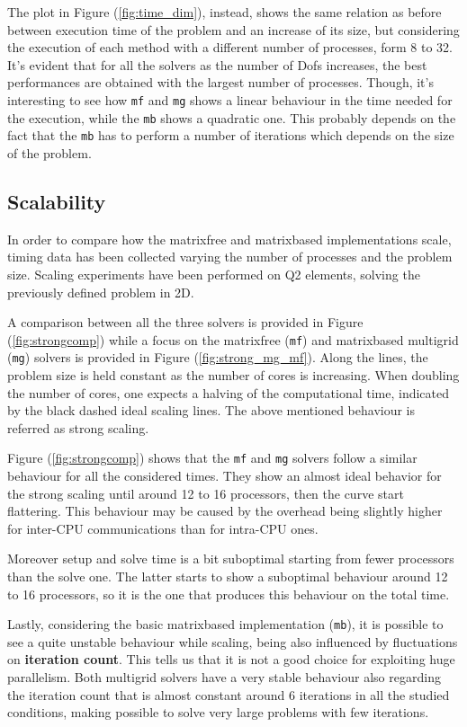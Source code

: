 \documentclass{article}
\begin{document}


The plot in Figure (\ref{fig:time_dim}), instead, shows the same relation as before between execution time of the problem and an increase of its size, but considering the execution of each method with a different number of processes, form 8 to 32.
It's evident that for all the solvers as the number of Dofs increases, the best performances are obtained with the largest number of processes.
Though, it's interesting to see how \verb|mf| and \verb|mg| shows a linear behaviour in the time needed for the execution, while the \verb|mb| shows a quadratic one.  This probably depends on the fact that the \verb|mb| has to perform a number of iterations which depends on the size of the problem.



\subsection{Scalability}
In order to compare how the matrixfree and matrixbased implementations scale, timing data has been collected varying the number of processes and the problem size. Scaling experiments have been performed on Q2 elements, solving the previously defined problem in 2D.

A comparison between all the three solvers is provided in Figure (\ref{fig:strongcomp}) while a focus on the matrixfree (\verb|mf|) and matrixbased multigrid (\verb|mg|) solvers is provided in Figure (\ref{fig:strong_mg_mf}).
Along the lines, the problem size is held constant as the number of cores is increasing. When doubling the number of cores, one expects a halving of the computational time, indicated by the black dashed ideal scaling lines. The above mentioned behaviour is referred as strong scaling.

Figure (\ref{fig:strongcomp}) shows that the \verb|mf| and \verb|mg| solvers follow a similar behaviour for all the considered times. They show an almost ideal behavior for the strong scaling until around 12 to 16 processors, then the curve start flattering. This behaviour may be caused by the overhead being slightly higher for inter-CPU communications than for intra-CPU ones.

Moreover setup and solve time is a bit suboptimal starting from fewer processors than the solve one. The latter starts to show a suboptimal behaviour around 12 to 16 processors, so it is the one that produces this behaviour on the total time.

Lastly, considering the basic matrixbased implementation (\verb|mb|), it is possible to see a quite unstable behaviour while scaling, being also influenced by fluctuations on \textbf{iteration count}. This tells us that it is not a good choice for exploiting huge parallelism. Both multigrid solvers have a very stable behaviour also regarding the iteration count that is almost constant around 6 iterations in all the studied conditions, making possible to solve very large problems with few iterations.

\end{document}
